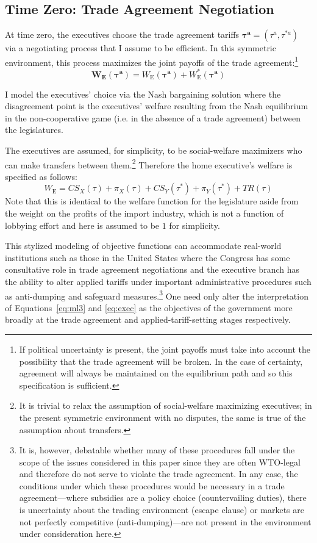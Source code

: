 \documentclass[authoryear, review]{elsarticle}
\newcommand{\bta}{\bm{\tau^a}}
\begin{document}
\subsection{Time Zero: Trade Agreement Negotiation}
\label{sec:zero}
At time zero, the executives choose the trade agreement tariffs $\bta=\left(\tau^a,\tau^{*a} \right)$ via a negotiating process that I assume to be efficient. In this symmetric environment, this process maximizes the joint payoffs of the trade agreement:\footnote{If political uncertainty is present, the joint payoffs must take into account the possibility that the trade agreement will be broken. In the case of certainty, agreement will always be maintained on the equilibrium path and so this specification is sufficient.}
\begin{equation}
  \bm{W_\text{E}}(\bta) = W_\text{E}(\bta) + W_\text{E}^*(\bta)
  \label{eq:jv3}
\end{equation}

I model the executives' choice via the Nash bargaining solution where the disagreement point is the executives' welfare resulting from the Nash equilibrium in the non-cooperative game (i.e. in the absence of a trade agreement) between the legislatures.

The executives are assumed, for simplicity, to be social-welfare maximizers who can make transfers between them.\footnote{It is trivial to relax the assumption of social-welfare maximizing executives; in the present symmetric environment with no disputes, the same is true of the assumption about transfers.} Therefore the home executive's welfare is specified as follows:
\begin{equation}
  W_\text{E} = \mathit{CS}_X(\tau) + \pi_X(\tau) + \mathit{CS}_Y(\tau^*) + \pi_Y(\tau^*) + \mathit{TR}(\tau)
	\label{eq:exec}
\end{equation}
Note that this is identical to the welfare function for the legislature aside from the weight on the profits of the import industry, which is not a function of lobbying effort and here is assumed to be $1$ for simplicity. 

This stylized modeling of objective functions can accommodate real-world institutions such as those in the United States where the Congress has some consultative role in trade agreement negotiations and the executive branch has the ability to alter applied tariffs under important administrative procedures such as anti-dumping and safeguard measures.\footnote{It is, however, debatable whether many of these procedures fall under the scope of the issues considered in this paper since they are often WTO-legal and therefore do not serve to violate the trade agreement. In any case, the conditions under which these procedures would be necessary in a trade agreement---where subsidies are a policy choice (countervailing duties), there is uncertainty about the trading environment (escape clause) or markets are not perfectly competitive (anti-dumping)---are not present in the environment under consideration here.} One need only alter the interpretation of Equations~\ref{eq:ml3} and \ref{eq:exec} as the objectives of the government more broadly at the trade agreement and applied-tariff-setting stages respectively.
\end{document}
